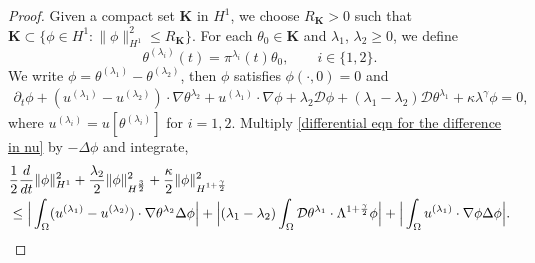 \documentclass[reqno]{amsart}%
\theoremstyle{definition}
\theoremstyle{remark}
\numberwithin{equation}{section}
\newcommand{\dt}{\partial_t}
\newcommand{\1}{\mathbf{1}}
\newcommand{\Uc}{\mathbf{K}}
\newcommand{\intox}{\int_{\Omega}}
\numberwithin{equation}{section}
\numberwithin{theorem}{section}
\numberwithin{figure}{section}
\begin{document}
\begin{proof}
Given a compact set $\Uc$ in $H^1$, we choose $R_\Uc>0$ such that $\Uc\subset\{\phi\in H^1:\|\phi\|^2_{H^1}\le R_{\Uc}\}$. For each $\theta_0\in\Uc$ and $\lambda_1$, $\lambda_2\ge0$, we define 
$$\theta^{(\lambda_i)}(t)=\pi^{\lambda_i}(t)\theta_0,\qquad i\in\{1,2\}.$$
We write $\phi=\theta^{(\lambda_1)}-\theta^{(\lambda_2)}$, then $\phi$ satisfies $\phi(\cdot,0)=0$ and 
\begin{align}\label{differential eqn for the difference in nu}
\dt \phi+(u^{(\lambda_1)}-u^{(\lambda_2)})\cdot\nabla\theta^{\lambda_2}+u^{(\lambda_1)}\cdot\nabla \phi+\lambda_2\mathcal{D}\phi+(\lambda_1-\lambda_2)\mathcal{D}\theta^{\lambda_1}+\kappa\lambda^\gamma \phi=0,
\end{align}
where $u^{(\lambda_i)}=u[\theta^{(\lambda_i)}]$ for $i=1,2$. Multiply \eqref{differential eqn for the difference in nu} by $-\Delta\phi$ and integrate,
\begin{align}\label{integral eqn for the difference in lambda}
&\frac{1}{2}\frac{d}{dt}\|\phi\|^2_{H^1}+\frac{\lambda_2}{2}\|\phi\|^2_{H^\frac{3}{2}}+\frac{\kappa}{2}\|\phi\|^2_{H^{1+\frac{\gamma}{2}}}\notag\\
&\le\Big|\intox (u^{(\lambda_1)}-u^{(\lambda_2)})\cdot\nabla\theta^{\lambda_2}\Delta \phi\Big|+\Big|(\lambda_1-\lambda_2)\intox\mathcal{D}\theta^{\lambda_1}\cdot\Lambda^{1+\frac{\gamma}{2}}\phi\Big|+\Big|\intox u^{(\lambda_1)}\cdot\nabla \phi\Delta \phi\Big|.
\end{align}


\end{proof}
\end{document}

